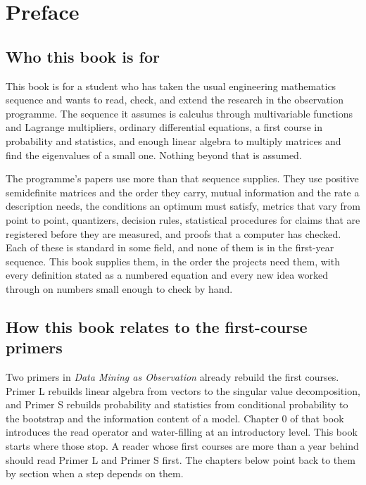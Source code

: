\chapter{Preface}\label{ch00}

\section*{Who this book is for}

This book is for a student who has taken the usual engineering mathematics sequence and wants to read, check, and extend the research in the observation programme. The sequence it assumes is calculus through multivariable functions and Lagrange multipliers, ordinary differential equations, a first course in probability and statistics, and enough linear algebra to multiply matrices and find the eigenvalues of a small one. Nothing beyond that is assumed.

The programme's papers use more than that sequence supplies. They use positive semidefinite matrices and the order they carry, mutual information and the rate a description needs, the conditions an optimum must satisfy, metrics that vary from point to point, quantizers, decision rules, statistical procedures for claims that are registered before they are measured, and proofs that a computer has checked. Each of these is standard in some field, and none of them is in the first-year sequence. This book supplies them, in the order the projects need them, with every definition stated as a numbered equation and every new idea worked through on numbers small enough to check by hand.

\section*{How this book relates to the first-course primers}

Two primers in \emph{Data Mining as Observation} already rebuild the first courses. Primer L rebuilds linear algebra from vectors to the singular value decomposition, and Primer S rebuilds probability and statistics from conditional probability to the bootstrap and the information content of a model. Chapter 0 of that book introduces the read operator and water-filling at an introductory level. This book starts where those stop. A reader whose first courses are more than a year behind should read Primer L and Primer S first. The chapters below point back to them by section when a step depends on them.

